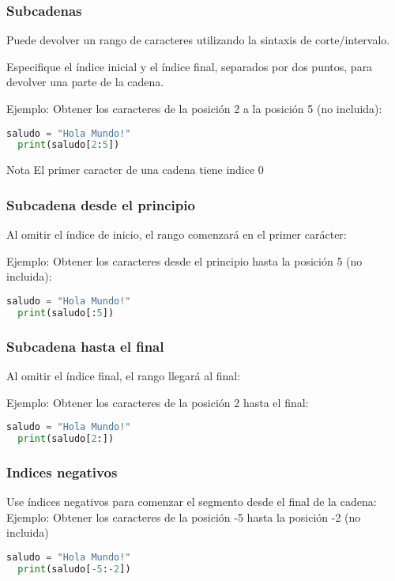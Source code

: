 \begin{frame}[fragile]
  \frametitle{Subcadenas}

  Puede devolver un rango de caracteres utilizando la sintaxis de
  corte/intervalo.

  \vspace{\baselineskip}
  Especifique el índice inicial y el índice final, separados por dos puntos,
  para devolver una parte de la cadena.

  \vspace{\baselineskip}
  Ejemplo: Obtener los caracteres de la posición 2 a la posición 5 (no incluida):
  \begin{lstlisting}[language=Python]
  saludo = "Hola Mundo!"
  print(saludo[2:5])
  \end{lstlisting}

  \begin{exampleblock}{Nota}
    El primer caracter de una cadena tiene indice 0
  \end{exampleblock}
\end{frame}

\begin{frame}[fragile]
  \frametitle{Subcadena desde el principio}

  Al omitir el índice de inicio, el rango comenzará en el primer carácter:

  \vspace{\baselineskip}
  Ejemplo: Obtener los caracteres desde el principio hasta la posición 5 (no incluida):
  \begin{lstlisting}[language=Python]
  saludo = "Hola Mundo!"
  print(saludo[:5])
  \end{lstlisting}
\end{frame}

\begin{frame}[fragile]
  \frametitle{Subcadena hasta el final}

  Al omitir el índice final, el rango llegará al final:

  \vspace{\baselineskip}
  Ejemplo: Obtener los caracteres de la posición 2 hasta el final:
  \begin{lstlisting}[language=Python]
  saludo = "Hola Mundo!"
  print(saludo[2:])
  \end{lstlisting}
\end{frame}

\begin{frame}[fragile]
  \frametitle{Indices negativos}

  Use índices negativos para comenzar el segmento desde el final de la cadena:
  \vspace{\baselineskip}
  Ejemplo: Obtener los caracteres de la posición -5 hasta la posición -2 (no
  incluida)
  \begin{lstlisting}[language=Python]
  saludo = "Hola Mundo!"
  print(saludo[-5:-2])
  \end{lstlisting}
\end{frame}


